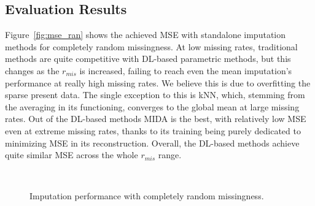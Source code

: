 			\subsection{Evaluation Results}
			
				Figure~\ref{fig:mse_ran} shows the achieved \ac{MSE} with standalone imputation methods for completely random missingness.
				At low missing rates, traditional methods are quite competitive with \ac{DL}-based parametric methods, but this changes as the $r_{mis}$ is increased, failing to reach even the mean imputation's performance at really high missing rates.
				We believe this is due to overfitting the sparse present data.
				The single exception to this is \ac{kNN}, which, stemming from the averaging in its functioning, converges to the global mean at large missing rates.
				Out of the \ac{DL}-based methods \ac{MIDA} is the best, with relatively low \ac{MSE} even at extreme missing rates, thanks to its training being purely dedicated to minimizing \ac{MSE} in its reconstruction.
				Overall, the \ac{DL}-based methods achieve quite similar \ac{MSE} across the whole $r_{mis}$ range.
				
				\begin{figure}[ht]
					\centering
					 \\
					\caption[Imputation performance with completely random missingness]{Imputation performance with completely random missingness.}
				\end{figure}
				
